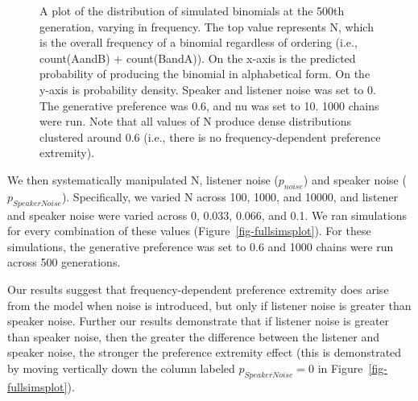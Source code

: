 \documentclass[
  12pt,
  letterpaper,
]{scrreport}
\begin{document}
\begin{figure}[htbp]

\caption{\label{fig-noNoisePlot}A plot of the distribution of simulated
binomials at the 500th generation, varying in frequency. The top value
represents N, which is the overall frequency of a binomial regardless of
ordering (i.e., count(AandB) + count(BandA)). On the x-axis is the
predicted probability of producing the binomial in alphabetical form. On
the y-axis is probability density. Speaker and listener noise was set to
0. The generative preference was 0.6, and nu was set to 10. 1000 chains
were run. Note that all values of N produce dense distributions
clustered around 0.6 (i.e., there is no frequency-dependent preference
extremity).}


\end{figure}%

We then systematically manipulated N, listener noise (\(p_{noise}\)) and
speaker noise (\(p_{SpeakerNoise}\)). Specifically, we varied N across
100, 1000, and 10000, and listener and speaker noise were varied across
0, 0.033, 0.066, and 0.1. We ran simulations for every combination of
these values (Figure~\ref{fig-fullsimsplot}). For these simulations, the
generative preference was set to 0.6 and 1000 chains were run across 500
generations.

Our results suggest that frequency-dependent preference extremity does
arise from the model when noise is introduced, but only if listener
noise is greater than speaker noise. Further our results demonstrate
that if listener noise is greater than speaker noise, then the greater
the difference between the listener and speaker noise, the stronger the
preference extremity effect (this is demonstrated by moving vertically
down the column labeled \(p_{SpeakerNoise} = 0\) in
Figure~\ref{fig-fullsimsplot}).
\end{document}
